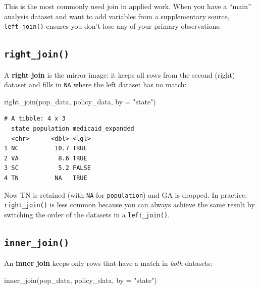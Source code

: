 \documentclass[
  letterpaper,
  DIV=11,
  numbers=noendperiod]{scrreprt}
\newenvironment{Shaded}{\begin{snugshade}}{\end{snugshade}}
\newcommand{\AttributeTok}[1]{\textcolor[rgb]{0.40,0.45,0.13}{#1}}
\newcommand{\FunctionTok}[1]{\textcolor[rgb]{0.28,0.35,0.67}{#1}}
\newcommand{\NormalTok}[1]{\textcolor[rgb]{0.00,0.23,0.31}{#1}}
\newcommand{\StringTok}[1]{\textcolor[rgb]{0.13,0.47,0.30}{#1}}
\begin{document}
This is the most commonly used join in applied work. When you have a
``main'' analysis dataset and want to add variables from a supplementary
source, \texttt{left\_join()} ensures you don't lose any of your primary
observations.

\subsection{\texorpdfstring{\texttt{right\_join()}}{right\_join()}}\label{right_join}

A \textbf{right join} is the mirror image: it keeps all rows from the
second (right) dataset and fills in \texttt{NA} where the left dataset
has no match:

\begin{Shaded}
\begin{Highlighting}[]
\FunctionTok{right\_join}\NormalTok{(pop\_data, policy\_data, }\AttributeTok{by =} \StringTok{"state"}\NormalTok{)}
\end{Highlighting}
\end{Shaded}

\begin{verbatim}
# A tibble: 4 x 3
  state population medicaid_expanded
  <chr>      <dbl> <lgl>            
1 NC          10.7 TRUE             
2 VA           8.6 TRUE             
3 SC           5.2 FALSE            
4 TN          NA   TRUE             
\end{verbatim}

Now TN is retained (with \texttt{NA} for \texttt{population}) and GA is
dropped. In practice, \texttt{right\_join()} is less common because you
can always achieve the same result by switching the order of the
datasets in a \texttt{left\_join()}.

\subsection{\texorpdfstring{\texttt{inner\_join()}}{inner\_join()}}\label{inner_join}

An \textbf{inner join} keeps only rows that have a match in \emph{both}
datasets:

\begin{Shaded}
\begin{Highlighting}[]
\FunctionTok{inner\_join}\NormalTok{(pop\_data, policy\_data, }\AttributeTok{by =} \StringTok{"state"}\NormalTok{)}
\end{Highlighting}
\end{Shaded}
\end{document}
